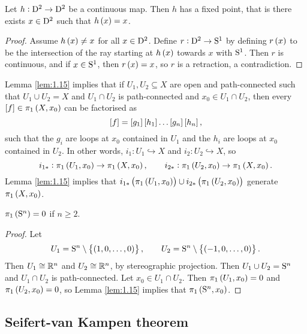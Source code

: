 \begin{theorem}
Let $ h : \D^2 \to \D^2 $ be a continuous map. Then $ h $ has a fixed point, that is there exists $ x \in \D^2 $ such that $ h\br{x} = x $.
\end{theorem}

\begin{proof}
Assume $ h\br{x} \ne x $ for all $ x \in \D^2 $. Define $ r : \D^2 \to \S^1 $ by defining $ r\br{x} $ to be the intersection of the ray starting at $ h\br{x} $ towards $ x $ with $ \S^1 $. Then $ r $ is continuous, and if $ x \in \S^1 $, then $ r\br{x} = x $, so $ r $ is a retraction, a contradiction.
\end{proof}

\pagebreak

Lemma \ref{lem:1.15} implies that if $ U_1, U_2 \subseteq X $ are open and path-connected such that $ U_1 \cup U_2 = X $ and $ U_1 \cap U_2 $ is path-connected and $ x_0 \in U_1 \cap U_2 $, then every $ \sbr{f} \in \pi_1\br{X, x_0} $ can be factorised as
$$ \sbr{f} = \sbr{g_1}\sbr{h_1} \dots \sbr{g_n}\sbr{h_n}, $$
such that the $ g_i $ are loops at $ x_0 $ contained in $ U_1 $ and the $ h_i $ are loops at $ x_0 $ contained in $ U_2 $. In other words, $ i_1 : U_1 \hookrightarrow X $ and $ i_2 : U_2 \hookrightarrow X $, so
$$ i_{1*} : \pi_1\br{U_1, x_0} \to \pi_1\br{X, x_0}, \qquad i_{2*} : \pi_1\br{U_2, x_0} \to \pi_1\br{X, x_0}. $$
Lemma \ref{lem:1.15} implies that $ i_{1*}\br{\pi_1\br{U_1, x_0}} \cup i_{2*}\br{\pi_1\br{U_2, x_0}} $ generate $ \pi_1\br{X, x_0} $.

\begin{proposition}
$ \pi_1\br{\S^n} = 0 $ if $ n \ge 2 $.
\end{proposition}

\begin{proof}
Let
$$ U_1 = \S^n \setminus \cbr{\br{1, 0, \dots, 0}}, \qquad U_2 = \S^n \setminus \cbr{\br{-1, 0, \dots, 0}}. $$
Then $ U_1 \cong \RR^n $ and $ U_2 \cong \RR^n $, by stereographic projection. Then $ U_1 \cup U_2 = \S^n $ and $ U_1 \cap U_2 $ is path-connected. Let $ x_0 \in U_1 \cap U_2 $. Then $ \pi_1\br{U_1, x_0} = 0 $ and $ \pi_1\br{U_2, x_0} = 0 $, so Lemma \ref{lem:1.15} implies that $ \pi_1\br{\S^n, x_0} $.
\end{proof}

\subsection{Seifert-van Kampen theorem}

